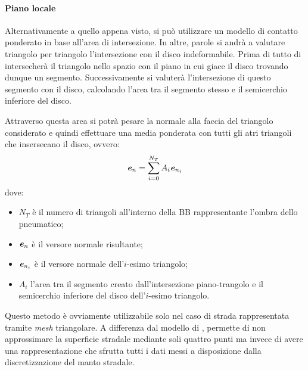 \paragraph{Piano locale}
Alternativamente a quello appena visto, si può utilizzare un modello di contatto ponderato in base all'area di intersezione. In altre, parole si andrà a valutare triangolo per triangolo l'intersezione con il disco indeformabile. Prima di tutto di intersecherà il triangolo nello spazio con il piano in cui giace il disco trovando dunque un segmento. Successivamente si valuterà l'intersezione di questo segmento con il disco, calcolando l'area tra il segmento stesso e il semicerchio inferiore del disco.


Attraverso questa area si potrà pesare la normale alla faccia del triangolo considerato e quindi effettuare una media ponderata con tutti gli atri triangoli che insersecano il disco, ovvero:
%
\begin{equation}
\textbf{\textit{e}}_n = \sum_{i=0}^{N_T}A_i\textbf{\textit{e}}_{n_i}
\label{ponderata}
\end{equation}
%
dove:
\begin{itemize}
	\item $N_T$ è il numero di triangoli all'interno della \ac{BB} rappresentante l'ombra dello pneumatico;
	\item $\textbf{\textit{e}}_n$ è il versore normale risultante;
	\item $\textbf{\textit{e}}_{n_i}$ è il versore normale dell'$i$-esimo triangolo;
	\item $A_i$ l'area tra il segmento creato dall'intersezione piano-trangolo e il semicerchio inferiore del disco dell'$i$-esimo triangolo.
\end{itemize}

Questo metodo è ovviamente utilizzabile solo nel caso di strada rappresentata tramite \textit{mesh} triangolare. A differenza dal modello di \cite{Rill}, permette di non approssimare la superficie stradale mediante soli quattro punti ma invece di avere una rappresentazione che sfrutta tutti i dati messi a disposizione dalla discretizzazione del manto stradale.
%
